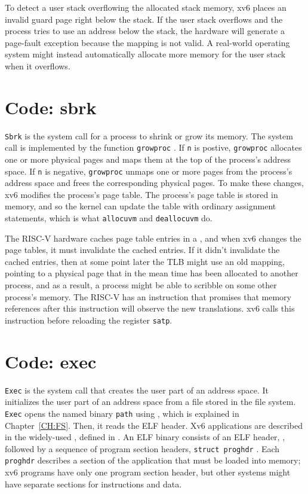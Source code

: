 To detect a user stack overflowing the allocated stack memory, xv6
places an invalid guard page right below the stack. If the user stack
overflows and the process tries to use an address below the stack, the
hardware will generate a page-fault exception because the mapping is
not valid. A real-world operating system might instead automatically
allocate more memory for the user stack when it overflows.

\section{Code: sbrk}

\lstinline{Sbrk}
is the system call for a process to shrink or grow its memory. The system
call is implemented by the function
\lstinline{growproc}
.
If
\lstinline{n}
is postive,
\lstinline{growproc}
allocates one or more physical pages and maps them at the top of the process's
address space.  If
\lstinline{n}
is negative,
\lstinline{growproc}
unmaps one or more pages from the process's address space and frees the corresponding
physical pages.
To make these changes,
xv6 modifies the process's page table.  The process's page table is stored in
memory, and so the kernel can update the table with ordinary assignment
statements, which is what
\lstinline{allocuvm}
and
\lstinline{deallocuvm}
do.

The RISC-V hardware caches page table entries in a
, and when xv6 changes
the page tables, it must invalidate the cached entries.  If it didn't
invalidate the cached entries, then at some point later the TLB might
use an old mapping, pointing to a physical page that in the mean time
has been allocated to another process, and as a result, a process
might be able to scribble on some other process's memory.  The RISC-V
has an instruction  that promises that memory
references after this instruction will observe the new translations.
xv6 calls this instruction before reloading the register
\texttt{satp}.

\section{Code: exec}
\lstinline{Exec}
is the system call that creates the user part of an address space.  It
initializes the user part of an address space from a file stored in the file
system.
\lstinline{Exec}
opens the named binary
\lstinline{path}
using
,
which is explained in Chapter~\ref{CH:FS}.
Then, it reads the ELF header. Xv6 applications are described in the widely-used
,
defined in
.
An ELF binary consists of an ELF header,
,
followed by a sequence of program section headers,
\lstinline{struct proghdr}
.
Each
\lstinline{proghdr}
describes a section of the application that must be loaded into memory;
xv6 programs have only one program section header, but
other systems might have separate sections
for instructions and data.

